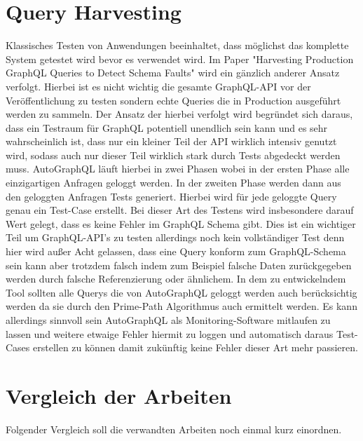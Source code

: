 \section{Query Harvesting}

Klassisches Testen von Anwendungen beeinhaltet, dass möglichst das komplette System getestet wird bevor es verwendet wird.
Im Paper "Harvesting Production GraphQL Queries to Detect Schema Faults" wird ein gänzlich anderer Ansatz verfolgt.
Hierbei ist es nicht wichtig die gesamte GraphQL-API vor der Veröffentlichung zu testen sondern
echte Queries die in Production ausgeführt werden zu sammeln.
Der Ansatz der hierbei verfolgt wird begründet sich daraus,
dass ein Testraum für GraphQL potentiell unendlich sein kann und es sehr wahrscheinlich ist, dass nur ein kleiner
Teil der API wirklich intensiv genutzt wird, sodass auch nur dieser Teil wirklich stark durch Tests abgedeckt werden muss.
AutoGraphQL läuft hierbei in zwei Phasen wobei in der ersten Phase alle einzigartigen Anfragen geloggt werden.
In der zweiten Phase werden dann aus den geloggten Anfragen Tests generiert.
Hierbei wird für jede geloggte Query genau ein Test-Case erstellt.
Bei dieser Art des Testens wird insbesondere darauf Wert gelegt, dass es keine Fehler im GraphQL Schema gibt.
Dies ist ein wichtiger Teil um GraphQL-API's zu testen allerdings noch kein vollständiger Test denn hier wird außer Acht gelassen,
dass eine Query konform zum GraphQL-Schema sein kann aber trotzdem falsch indem zum Beispiel falsche Daten zurückgegeben werden
durch falsche Referenzierung oder ähnlichem.
In dem zu entwickelndem Tool sollten alle Querys die von AutoGraphQL geloggt werden auch berücksichtig werden da sie durch
den Prime-Path Algorithmus auch ermittelt werden.
Es kann allerdings sinnvoll sein AutoGraphQL als Monitoring-Software mitlaufen zu lassen und weitere etwaige Fehler hiermit zu loggen
und automatisch daraus Test-Cases erstellen zu können damit zukünftig keine Fehler dieser Art mehr passieren.

\section{Vergleich der Arbeiten}
Folgender Vergleich soll die verwandten Arbeiten noch einmal kurz einordnen.

